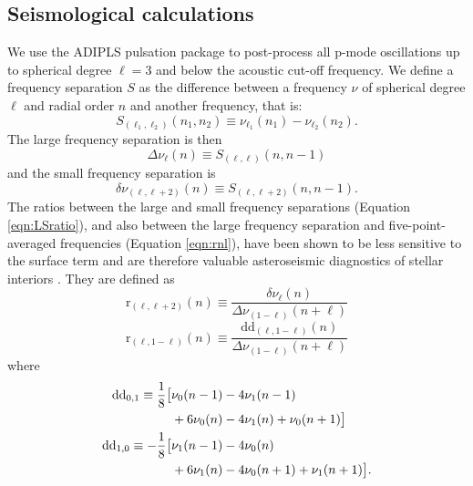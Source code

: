 \documentclass[manuscript]{aastex}
\begin{document}
\subsection{Seismological calculations}
\label{sec:seis}
We use the ADIPLS pulsation package \citep{2008Ap&SS.316..113C} to post-process all p-mode oscillations up to spherical degree $\ell=3$ and below the acoustic cut-off frequency. We define a frequency separation $S$ as the difference between a frequency $\nu$ of spherical degree $\ell$ and radial order $n$ and another frequency, that is:
\begin{equation} 
  S_{(\ell_1, \ell_2)}(n_1, n_2) \equiv \nu_{\ell_1}(n_1) - \nu_{\ell_2}(n_2).
\end{equation}
The large frequency separation is then
\begin{equation} 
  \Delta\nu_\ell(n) \equiv S_{(\ell, \ell)}(n, n-1)
\end{equation}
and the small frequency separation is
\begin{equation}
  \delta\nu_{(\ell, \ell+2)}(n) \equiv S_{(\ell, \ell+2)}(n, n-1).
\end{equation}
The ratios between the large and small frequency separations (Equation \ref{eqn:LSratio}), and also between the large frequency separation and five-point-averaged frequencies (Equation \ref{eqn:rnl}), have been shown to be less sensitive to the surface term and are therefore valuable asteroseismic diagnostics of stellar interiors \citep{2003A&A...411..215R}. They are defined as
\begin{equation} 
  \mathrm{r}_{(\ell,\ell+2)}(n) \equiv \frac{\delta\nu_\ell(n)}{\Delta\nu_{(1-\ell)}(n+\ell)} \label{eqn:LSratio}
\end{equation}
\begin{equation} 
  \mathrm{r}_{(\ell, 1-\ell)}(n) \equiv \frac{\mathrm{dd}_{(\ell,1-\ell)}(n)}{\Delta\nu_{(1-\ell)}(n+\ell)} \label{eqn:rnl}
\end{equation}
where
\begin{align} 
  \mathrm{dd}_{0,1} \equiv \frac{1}{8} \big[&\nu_0(n-1) - 4\nu_1(n-1) \notag\\
                                 &+6\nu_0(n) - 4\nu_1(n) + \nu_0(n+1)\big]\\ 
  \mathrm{dd}_{1,0} \equiv -\frac{1}{8} \big[&\nu_1(n-1) - 4\nu_0(n) \notag\\
                                 &+6\nu_1(n) - 4\nu_0(n+1) + \nu_1(n+1)\big].
\end{align}
\end{document}
